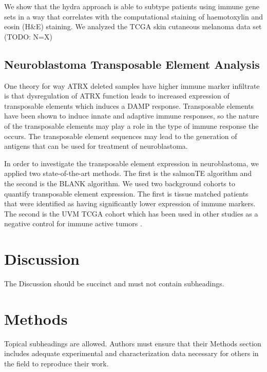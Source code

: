 \documentclass[fleqn,10pt]{wlscirep}
\begin{document}
We show that the hydra approach is able to subtype patients using immune gene sets in a way that correlates with the computational staining of haemotoxylin and eosin (H\&E) staining. We analyzed the TCGA skin cutaneous melanoma data set (TODO: N=X)

\subsection*{Neuroblastoma Transposable Element Analysis}
One theory for way ATRX deleted samples have higher immune marker infiltrate is that dysregulation of ATRX function leads to increased expression of transposable elements which induces a DAMP response. Transposable elements have been shown to induce innate and adaptive immune responses, so the nature of the transposable elements may play a role in the type of immune response the occurs. The transposable element sequences may lead to the generation of antigens that can be used for treatment of neuroblastoma. 

In order to investigate the transposable element expression in neuroblastoma, we applied two state-of-the-art methods. The first is the salmonTE algorithm and the second is the BLANK algorithm. We used two background cohorts to quantify transposable element expression. The first is tissue matched patients that were identified as having significantly lower expression of immune markers. The second is the UVM TCGA cohort which has been used in other studies as a negative control for immune active tumors \cite{bindea2013spatiotemporal,thorsson2018immune}.


\section*{Discussion}

The Discussion should be succinct and must not contain subheadings.

\section*{Methods}

Topical subheadings are allowed. Authors must ensure that their Methods section includes adequate experimental and characterization data necessary for others in the field to reproduce their work.
\end{document}
